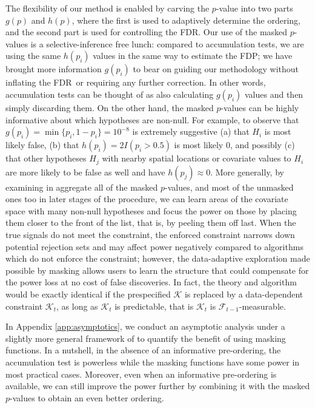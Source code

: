 \documentclass{biometrika}
\newcommand{\cF}{\mathcal{F}}
\newcommand{\cK}{\mathcal{K}}
\newcommand{\textFDP}{FDP}
\newcommand{\textFDR}{FDR}
\newcommand{\1}{\mathbf{1}}
\begin{document}
The flexibility of our method is enabled by carving the $p$-value into two parts $g(p)$ and $h(p)$, where the first is used to adaptively determine the ordering, and the second part is used for controlling the \textFDR. Our use of the masked $p$-values is a selective-inference free lunch: compared to accumulation tests, we are using the same $h(p_i)$ values in the same way to estimate the \textFDP; we have brought more information  $g(p_i)$ to bear on guiding our methodology without inflating the \textFDR ~or requiring any further correction. In other words, accumulation tests can be thought of as also calculating $g(p_i)$ values and then simply discarding them. On the other hand, the masked $p$-values can be highly informative about which hypotheses are non-null. For example, to observe that $g(p_{i}) = \min\{p_{i}, 1 - p_{i}\} = 10^{-8}$ is extremely suggestive (a) that $H_{i}$ is most likely false, (b) that $h(p_{i}) = 2I(p_{i} > 0.5)$ is most likely 0, and possibly (c) that other hypotheses $H_{j}$ with nearby spatial locations or covariate values to $H_{i}$ are more likely to be false as well and have $h(p_{j}) \approx 0$. More generally, by examining in aggregate all of the masked $p$-values, and most of the unmasked ones too in later stages of the procedure, we can learn areas of the covariate space with many non-null hypotheses and focus the power on those by placing them closer to the front of the list, that is, by peeling them off last. When the true signals do not meet the constraint, the enforced constraint narrows down potential rejection sets and may affect power negatively compared to algorithms which do not enforce the constraint; however, the data-adaptive exploration made possible by masking allows users to learn the structure that could compensate for the power loss at no cost of false discoveries. In fact, the theory and algorithm would be exactly identical if the prespecified $\cK$ is replaced by a data-dependent constraint $\cK_t$, as long as $\cK_t$ is predictable, that is $\cK_t$ is $\cF_{t-1}$-measurable.

In Appendix \ref{app:asymptotics}, we conduct an asymptotic analysis under a slightly more general framework of \cite{li2016accumulation} to quantify the benefit of using masking functions. In a nutshell, in the absence of an informative pre-ordering, the accumulation test is powerless while the masking functions have some power in most practical cases. Moreover, even when an informative pre-ordering is available, we can still improve the power further by combining it with the masked $p$-values to obtain an even better ordering.
\end{document}
